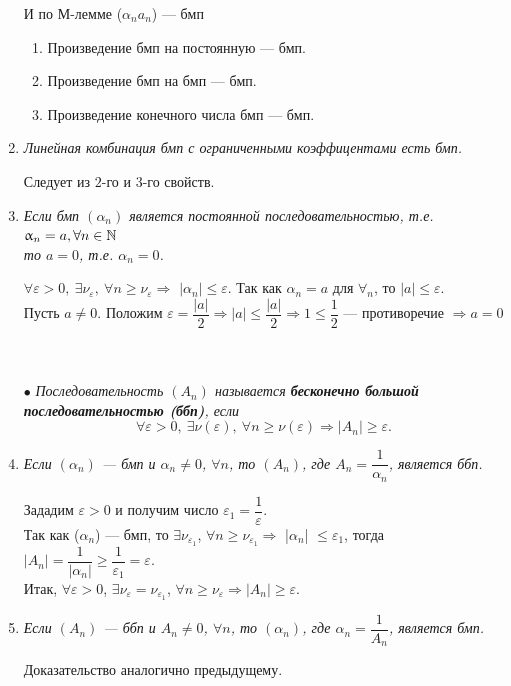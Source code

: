 \begin{enumerate}
\begin{Proof}
		И по М-лемме ($\alpha_n a_n$) --- бмп
	\end{Proof}
	\begin{cor}
		\begin{enumerate}
			\item Произведение бмп на постоянную --- бмп.
			\item Произведение бмп на бмп --- бмп.
			\item Произведение конечного числа бмп --- бмп.
		\end{enumerate}
	\end{cor}
	\item \textit{Линейная комбинация бмп с ограниченными коэффицентами есть бмп.}
	\begin{Proof}
		Следует из $2$-го и $3$-го свойств.
	\end{Proof}
	\item \textit{Если бмп $(\alpha_n)$ является постоянной последовательностью, т.е. $\upalpha_n = a , \forall n \in \mathbb{N}$ \\ то $a=0$, т.е. $\alpha_n = 0$.}
	\begin{Proof}
		$\forall\varepsilon>0,\ \exists\nu_\varepsilon,\ \forall n  \geqslant \nu_\varepsilon \Rightarrow$ $|\alpha_n|\leqslant \varepsilon$. Так как $\alpha_n=a$ для $\forall_n$, то $|a|\leqslant \varepsilon$.\\
		Пусть $a \neq 0$. Положим $\varepsilon = \dfrac{|a|}{2} \Rightarrow |a|\leqslant \dfrac{|a|}{2} \Rightarrow 1 \leqslant \dfrac{1}{2} $ --- противоречие $\Rightarrow a = 0$
	\end{Proof}\\\\
	$\bullet$ \textit{Последовательность $(A_n)$ называется \textbf{бесконечно большой последовательностью (ббп)},
		если $$\forall\varepsilon>0,\ \exists\nu (\varepsilon),\ \forall n  \geqslant \nu (\varepsilon) \Rightarrow |A_n|\geqslant \varepsilon.$$}
	\item \textit{Если $(\alpha_n)$ --- бмп и $\alpha_n \neq  0$, $\forall n$, то $(A_n)$, где $A_n=\dfrac{1}{\alpha_n}$, является ббп.}
	\begin{Proof}
		Зададим $\varepsilon>0$ и получим число $\varepsilon_1= \dfrac{1}{\varepsilon}$.\\
		Так как ($\alpha_n$) --- бмп, то $\exists\nu_{\varepsilon_1}$, $\forall n \geqslant \nu_{\varepsilon_1}\Rightarrow$ |$\alpha_n$| $\leqslant \varepsilon_1$,
		тогда $|A_n|=\dfrac{1}{|\alpha_n|}\geqslant\dfrac{1}{\varepsilon_1}=\varepsilon$.\\
		Итак, $\forall\varepsilon>0$, $\exists \nu_\varepsilon=\nu_{\varepsilon_1}$, $\forall n \geqslant \nu_\varepsilon\Rightarrow|A_n|\geqslant\varepsilon $.
	\end{Proof}
	\item \textit{Если $(A_n)$ --- ббп и $A_n \neq  0$, $\forall n$, то $(\alpha_n)$, где $\alpha_n=\dfrac{1}{A_n}$, является бмп.}\\
	\begin{Proof}
		Доказательство аналогично предыдущему.
	\end{Proof}
\end{enumerate}
